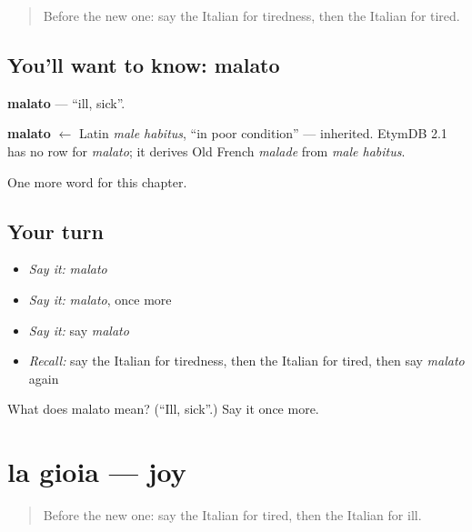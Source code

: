 \begin{quote}
Before the new one: say the Italian for tiredness, then the Italian for tired.
\end{quote}

\subsection*{You'll want to know: malato}
\textbf{malato} — \textquotedblleft{}ill, sick\textquotedblright{}.

\begin{cousinweb}
\textbf{malato} $\leftarrow$ Latin \emph{male habitus}, \textquotedblleft{}in poor condition\textquotedblright{} — inherited. EtymDB 2.1 has no row for \emph{malato}; it derives Old French \emph{malade} from \emph{male habitus}.
\end{cousinweb}

\begin{grammarlens}[title={What you've built}]
One more word for this chapter.
\end{grammarlens}

\subsection*{Your turn}
\begin{itemize}
\raggedright
  \item \emph{Say it:} \emph{malato}
  \item \emph{Say it:} \emph{malato}, once more
  \item \emph{Say it:} say \emph{malato}
  \item \emph{Recall:} say the Italian for tiredness, then the Italian for tired, then say \emph{malato} again
\end{itemize}

\begin{tcolorbox}[breakable,colback=teal!4,colframe=teal!35!black,title={Before you move on}]
What does malato mean? (\textquotedblleft{}Ill, sick\textquotedblright{}.) Say it once more.
\end{tcolorbox}
\section[la gioia]{la gioia — joy}

\label{lesson:IT-C42-gioia}



\begin{quote}
Before the new one: say the Italian for tired, then the Italian for ill.
\end{quote}

